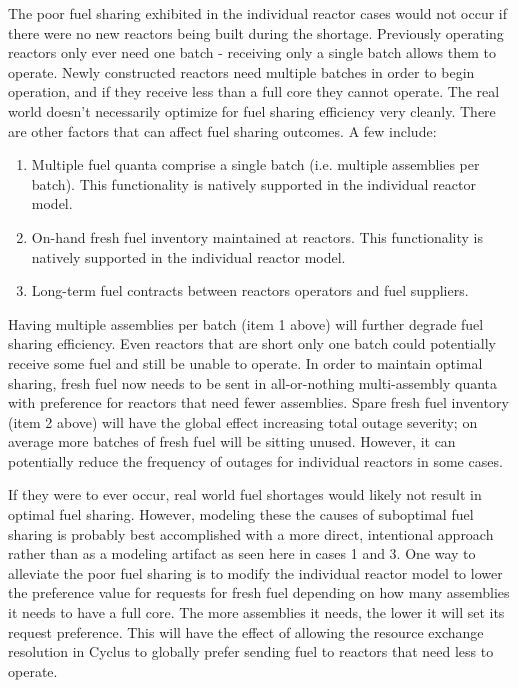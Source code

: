 \documentclass{style}
\begin{document}
The poor fuel sharing exhibited in the individual reactor cases would not
occur if there were no new reactors being built during the shortage.
Previously operating reactors only ever need one batch - receiving only a
single batch allows them to operate.  Newly constructed reactors need multiple
batches in order to begin operation, and if they receive less than a full core
they cannot operate.  The real world doesn't necessarily optimize for fuel
sharing efficiency very cleanly. There are other factors that can affect fuel
sharing outcomes.  A few include:

\begin{enumerate}

    \item Multiple fuel quanta comprise a single batch (i.e. multiple
        assemblies per batch). This functionality is natively supported in the
        individual reactor model.

    \item On-hand fresh fuel inventory maintained at reactors. This
        functionality is natively supported in the individual reactor model.

    \item Long-term fuel contracts between reactors operators and fuel
        suppliers.

\end{enumerate}

Having multiple assemblies per batch (item 1 above) will further degrade fuel
sharing efficiency.  Even reactors that are short only one batch could
potentially receive some fuel and still be unable to operate.  In order to
maintain optimal sharing, fresh fuel now needs to be sent in all-or-nothing
multi-assembly quanta with preference for reactors that need fewer assemblies.
Spare fresh fuel inventory (item 2 above) will have the global effect
increasing total outage severity; on average more batches of fresh fuel will
be sitting unused.  However, it can potentially reduce the frequency of
outages for individual reactors in some cases.

If they were to ever occur, real world fuel shortages would likely not result
in optimal fuel sharing. However, modeling these the causes of suboptimal fuel
sharing is probably best accomplished with a more direct, intentional approach
rather than as a modeling artifact as seen here in cases 1 and 3.  One way to
alleviate the poor fuel sharing is to modify the individual reactor model to
lower the preference value for requests for fresh fuel depending on how many
assemblies it needs to have a full core.  The more assemblies it needs, the
lower it will set its request preference.  This will have the effect of
allowing the resource exchange resolution in Cyclus to globally prefer sending
fuel to reactors that need less to operate.
\end{document}

